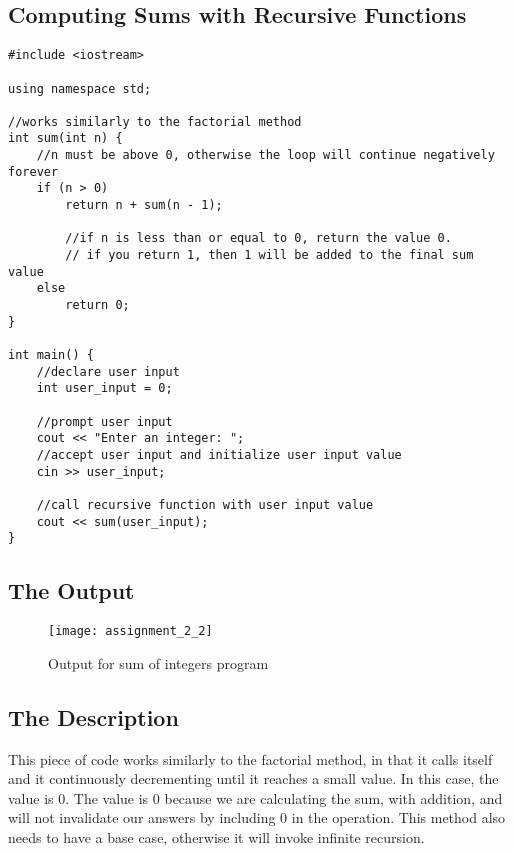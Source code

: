 \documentclass[11pt]{article}
\begin{document}
\subsection*{Computing Sums with Recursive Functions}
\begin{lstlisting}
#include <iostream>

using namespace std;

//works similarly to the factorial method
int sum(int n) {
    //n must be above 0, otherwise the loop will continue negatively forever
    if (n > 0)
        return n + sum(n - 1);

        //if n is less than or equal to 0, return the value 0.
        // if you return 1, then 1 will be added to the final sum value
    else
        return 0;
}

int main() {
    //declare user input
    int user_input = 0;

    //prompt user input
    cout << "Enter an integer: ";
    //accept user input and initialize user input value
    cin >> user_input;

    //call recursive function with user input value
    cout << sum(user_input);
}
\end{lstlisting}

\subsection*{The Output}
\begin{figure}[H]
    \centering
    \texttt{[image: assignment\_2\_2]}
    \caption{Output for sum of integers program}
    \label{fig:part 2}
\end{figure}

\subsection*{The Description}
This piece of code works similarly to the factorial method, in that it calls itself and it continuously decrementing until it reaches a small value. In this case, the value is 0. The value is 0 because we are calculating the sum, with addition, and will not invalidate our answers by including 0 in the operation. This method also needs to have a base case, otherwise it will invoke infinite recursion. 
\end{document}
